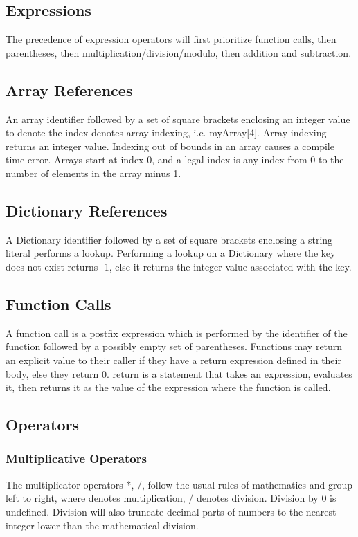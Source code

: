 \documentclass[12pt]{article}
\begin{document}
\subsection{Expressions}
The precedence of expression operators will first prioritize function calls, then parentheses, then multiplication/division/modulo, then addition and subtraction.  

\subsection{Array References}
An array identifier followed by a set of square brackets enclosing an integer value to denote the index denotes array indexing, i.e. myArray[4].  Array indexing returns an integer value.  Indexing out of bounds in an array causes a compile time error.  Arrays start at index 0, and a legal index is any index from 0 to the number of elements in the array minus 1.

\subsection{Dictionary References}
A Dictionary identifier followed by a set of square brackets enclosing a string literal performs a lookup. Performing a lookup on a Dictionary where the key does not exist returns -1, else it returns the integer value associated with the key.

\subsection{Function Calls}
A function call is a postfix expression which is performed by the identifier of the function
followed by a possibly empty set of parentheses. Functions may return an explicit value to their caller if they have a return expression defined in their body, else they return 0.  return is a statement that takes an expression, evaluates it, then returns it as the value of the expression where the function is called.

\subsection{Operators}

\subsubsection{Multiplicative Operators}
The multiplicator operators *, /, follow the usual rules of mathematics and group left to right, where \* denotes multiplication, / denotes division. Division by 0 is undefined.  Division will also truncate decimal parts of numbers to the nearest integer lower than the mathematical division.
\end{document}
